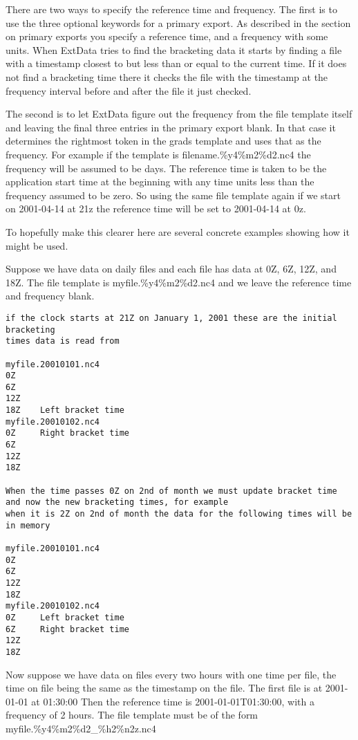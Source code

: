 There are two ways to specify the reference time and frequency.
The first is to use the three optional keywords for a primary export. As described in the section on primary exports
you specify a reference time, and a frequency with some units. When ExtData tries to find the bracketing data it
starts by finding a file with a timestamp closest to but less than or equal to the current time. If it does not find a bracketing time
there it checks the file with the timestamp at the frequency interval before and after the file it just checked.

The second is to let ExtData figure out the frequency from the file template itself and leaving the final three entries in the
primary export blank. In that case it determines the rightmost token in the grads template and uses that as the frequency.
For example if the template is filename.\%y4\%m2\%d2.nc4 the frequency will be assumed to be days. The reference time is taken
to be the application start time at the beginning with any time units less than the frequency assumed to be zero. So using
the same file template again if we start on 2001-04-14 at 21z the reference time will be set to 2001-04-14 at 0z.

To hopefully make this clearer here are several concrete examples showing how it might be used.

Suppose we have data on daily files and each file has data at 0Z, 6Z, 12Z, and 18Z.
The file template is myfile.\%y4\%m2\%d2.nc4 and we leave the reference time and frequency blank.

\begin{verbatim}
if the clock starts at 21Z on January 1, 2001 these are the initial bracketing
times data is read from

myfile.20010101.nc4
0Z
6Z
12Z
18Z    Left bracket time
myfile.20010102.nc4
0Z     Right bracket time
6Z
12Z
18Z

When the time passes 0Z on 2nd of month we must update bracket time
and now the new bracketing times, for example
when it is 2Z on 2nd of month the data for the following times will be in memory

myfile.20010101.nc4
0Z
6Z
12Z
18Z 
myfile.20010102.nc4
0Z     Left bracket time
6Z     Right bracket time
12Z
18Z
\end{verbatim}

Now suppose we have data on files every two hours with one time per file, the time on file
being the same as the timestamp on the file. The first file is at 2001-01-01 at 01:30:00
Then the reference time is 2001-01-01T01:30:00, with a frequency of 2 hours.
The file template must be of the form myfile.\%y4\%m2\%d2\_\%h2\%n2z.nc4

